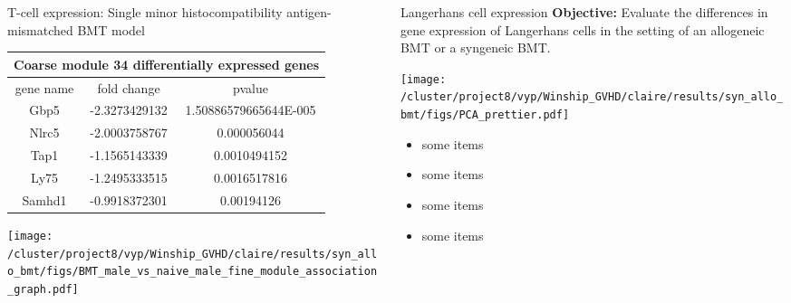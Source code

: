 \documentclass[final,hyperref={pdfpagelabels=false}]{beamer}
\begin{document}
\begin{frame}{}
\begin{columns}[t]
\begin{column}{.25\linewidth}
\begin{block}{T-cell expression: Single minor histocompatibility antigen-mismatched BMT model}
{\scriptsize    \begin{tabular}{ |c|c|c| } 
	    \hline
	    \multicolumn{3}{|c|}{Coarse module 34 differentially expressed genes} \\
	      \hline
	      gene name & fold change & pvalue \\
	      \hline
	    Gbp5 	 &-2.3273429132	& 1.50886579665644E-005 \\ %
            Nlrc5 	& -2.0003758767	& 0.000056044 \\ %
            Tap1 	& -1.1565143339	& 0.0010494152 \\
            Ly75 	& -1.2495333515	& 0.0016517816 \\
            Samhd1 	& -0.9918372301	& 0.00194126 \\
	      \hline
	    \end{tabular} }
	  \begin{minipage}{0.45\textwidth}
            \texttt{[image: /cluster/project8/vyp/Winship\_GVHD/claire/results/syn\_allo\_bmt/figs/BMT\_male\_vs\_naive\_male\_fine\_module\_association\_graph.pdf]}
          \end{minipage}
        \end{block}
      \end{column}


      \begin{column}{.25\linewidth}
        \begin{block}{Langerhans cell expression}
	  {\bf Objective:} Evaluate the differences in gene expression of Langerhans cells in the setting of an allogeneic BMT or a syngeneic BMT.
           \begin{center}
           \texttt{[image: /cluster/project8/vyp/Winship\_GVHD/claire/results/syn\_allo\_bmt/figs/PCA\_prettier.pdf]}
          \end{center}
{\small
          \begin{itemize}
          \item some items
          \item some items
          \item some items
          \item some items
          \end{itemize}}


\end{block}
\end{column}
\end{columns}
\end{frame}
\end{document}
